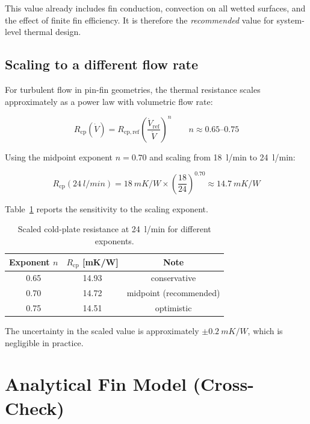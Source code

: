 \documentclass[a4paper,11pt]{article}
\begin{document}
This value already includes fin conduction, convection on all wetted surfaces, and
the effect of finite fin efficiency. It is therefore the \emph{recommended} value
for system-level thermal design.

\subsection{Scaling to a different flow rate}

For turbulent flow in pin-fin geometries, the thermal resistance scales approximately
as a power law with volumetric flow rate:

\begin{equation}
  R_{\mathrm{cp}}(\dot{V}) = R_{\mathrm{cp,ref}}
    \left(\frac{\dot{V}_{\mathrm{ref}}}{\dot{V}}\right)^{n}
  \qquad n \approx 0.65\text{--}0.75
\end{equation}

Using the midpoint exponent $n = 0.70$ and scaling from \SI{18}{l/min} to
\SI{24}{l/min}:

\begin{equation}
  R_{\mathrm{cp}}(\SI{24}{l/min})
    = \SI{18}{mK/W} \times \left(\frac{18}{24}\right)^{0.70}
    \approx \SI{14.7}{mK/W}
\end{equation}

Table~\ref{tab:scaling} reports the sensitivity to the scaling exponent.

\begin{table}[H]
\centering
\caption{Scaled cold-plate resistance at \SI{24}{l/min} for different exponents.}
\label{tab:scaling}
\begin{tabular}{ccc}
\toprule
Exponent $n$ & $R_{\mathrm{cp}}$ [\si{mK/W}] & Note \\
\midrule
0.65 & 14.93 & conservative \\
0.70 & 14.72 & midpoint (recommended) \\
0.75 & 14.51 & optimistic \\
\bottomrule
\end{tabular}
\end{table}

The uncertainty in the scaled value is approximately $\pm\SI{0.2}{mK/W}$, which is
negligible in practice.

\section{Analytical Fin Model (Cross-Check)}
\end{document}
